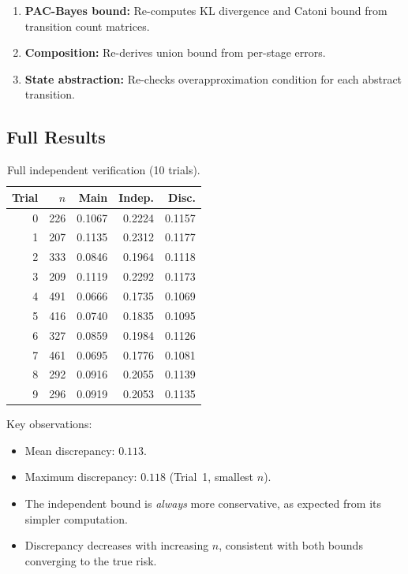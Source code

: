 \documentclass[11pt]{article}
\begin{document}
\begin{enumerate}[nosep]
  \item \textbf{PAC-Bayes bound:} Re-computes KL divergence and
        Catoni bound from transition count matrices.
  \item \textbf{Composition:} Re-derives union bound from per-stage
        errors.
  \item \textbf{State abstraction:} Re-checks overapproximation
        condition for each abstract transition.
\end{enumerate}

\subsection{Full Results}

\begin{table}[h]
\centering
\caption{Full independent verification (10
trials).}\label{tab:indepfull}
\small
\begin{tabular}{@{}rrrrr@{}}
\toprule
\textbf{Trial} & $n$ & \textbf{Main}
  & \textbf{Indep.} & \textbf{Disc.} \\
\midrule
0 & 226 & 0.1067 & 0.2224 & 0.1157 \\
1 & 207 & 0.1135 & 0.2312 & 0.1177 \\
2 & 333 & 0.0846 & 0.1964 & 0.1118 \\
3 & 209 & 0.1119 & 0.2292 & 0.1173 \\
4 & 491 & 0.0666 & 0.1735 & 0.1069 \\
5 & 416 & 0.0740 & 0.1835 & 0.1095 \\
6 & 327 & 0.0859 & 0.1984 & 0.1126 \\
7 & 461 & 0.0695 & 0.1776 & 0.1081 \\
8 & 292 & 0.0916 & 0.2055 & 0.1139 \\
9 & 296 & 0.0919 & 0.2053 & 0.1135 \\
\bottomrule
\end{tabular}
\end{table}

Key observations:
\begin{itemize}[nosep]
  \item Mean discrepancy: $0.113$.
  \item Maximum discrepancy: $0.118$ (Trial~1, smallest $n$).
  \item The independent bound is \emph{always} more conservative,
        as expected from its simpler computation.
  \item Discrepancy decreases with increasing $n$, consistent with
        both bounds converging to the true risk.
\end{itemize}
\end{document}
